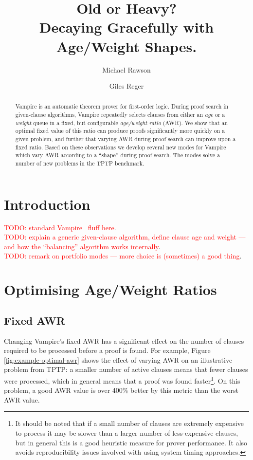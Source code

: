 \documentclass{llncs}
\title{Old or Heavy?\\Decaying Gracefully with Age/Weight Shapes.}
\author{Michael Rawson \and Giles Reger}
\institute{University of Manchester, Manchester, UK}
\newcommand{\todo}[1]{\textcolor{red}{TODO: #1}}
\begin{document}
\maketitle
\begin{abstract}
Vampire is an automatic theorem prover for first-order logic.
During proof search in given-clause algorithms, Vampire repeatedly selects clauses from either an \emph{age} or a \emph{weight} queue in a fixed, but configurable \emph{age/weight ratio} (AWR).
We show that an optimal fixed value of this ratio can produce proofs significantly more quickly on a given problem, and further that varying AWR during proof search can improve upon a fixed ratio.
Based on these observations we develop several new modes for Vampire which vary AWR according to a ``shape'' during proof search.
The modes solve a number of new problems in the TPTP benchmark.
\end{abstract}

\section{Introduction}
\label{sec:introduction}
\todo{standard Vampire~\cite{vampire} fluff here}.\\
\todo{explain a generic given-clause algorithm, define clause age and weight --- and how the ``balancing'' algorithm works internally}.\\
\todo{remark on portfolio modes --- more choice is (sometimes) a good thing}.

\section{Optimising Age/Weight Ratios}
\subsection{Fixed AWR}
Changing Vampire's fixed AWR has a significant effect on the number of clauses required to be processed before a proof is found.
For example, Figure \ref{fig:example-optimal-awr} shows the effect of varying AWR on an illustrative problem from TPTP: a smaller number of active clauses means that fewer clauses were processed, which in general means that a proof was found faster\footnote{
It should be noted that if a small number of clauses are extremely expensive to process it may be slower than a larger number of less-expensive clauses, but in general this is a good heuristic measure for prover performance.
It also avoids reproducibility issues involved with using system timing approaches.
}.
On this problem, a good AWR value is over 400\% better by this metric than the worst AWR value.
\end{document}
